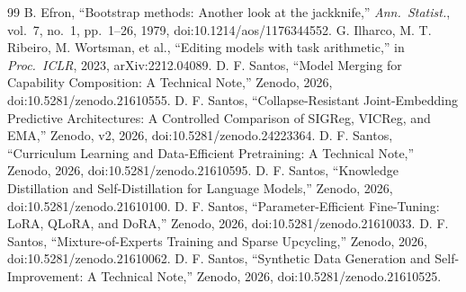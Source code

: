 \documentclass[conference]{IEEEtran}
\begin{document}
\begin{thebibliography}{99}
 B. Efron, ``Bootstrap methods: Another look at the jackknife,'' \emph{Ann.\ Statist.}, vol.~7, no.~1, pp.~1--26, 1979, doi:10.1214/aos/1176344552.
 G. Ilharco, M. T. Ribeiro, M. Wortsman, et al., ``Editing models with task arithmetic,'' in \emph{Proc.\ ICLR}, 2023, arXiv:2212.04089.
 D. F. Santos, ``Model Merging for Capability Composition: A Technical Note,'' Zenodo, 2026, doi:10.5281/zenodo.21610555.
 D. F. Santos, ``Collapse-Resistant Joint-Embedding Predictive Architectures: A Controlled Comparison of SIGReg, VICReg, and EMA,'' Zenodo, v2, 2026, doi:10.5281/zenodo.24223364.
 D. F. Santos, ``Curriculum Learning and Data-Efficient Pretraining: A Technical Note,'' Zenodo, 2026, doi:10.5281/zenodo.21610595.
 D. F. Santos, ``Knowledge Distillation and Self-Distillation for Language Models,'' Zenodo, 2026, doi:10.5281/zenodo.21610100.
 D. F. Santos, ``Parameter-Efficient Fine-Tuning: LoRA, QLoRA, and DoRA,'' Zenodo, 2026, doi:10.5281/zenodo.21610033.
 D. F. Santos, ``Mixture-of-Experts Training and Sparse Upcycling,'' Zenodo, 2026, doi:10.5281/zenodo.21610062.
 D. F. Santos, ``Synthetic Data Generation and Self-Improvement: A Technical Note,'' Zenodo, 2026, doi:10.5281/zenodo.21610525.
\end{thebibliography}
\end{document}
